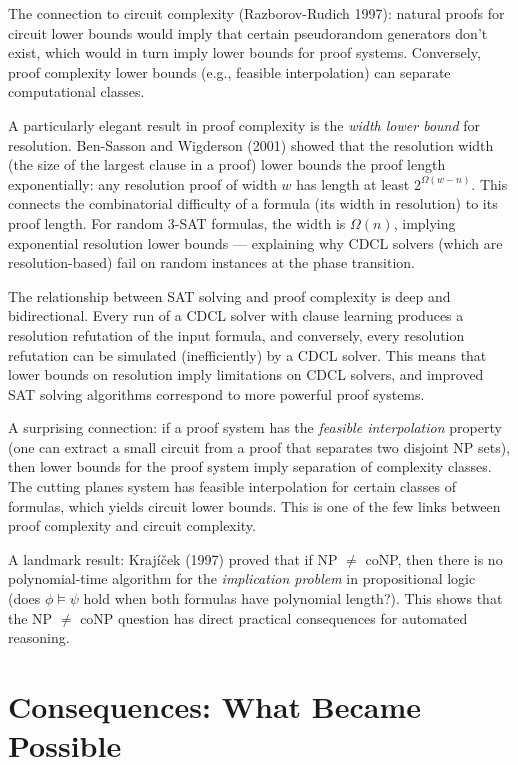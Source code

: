 The connection to circuit complexity (Razborov-Rudich 1997): natural proofs for circuit lower bounds would imply that certain pseudorandom generators don't exist, which would in turn imply lower bounds for proof systems. Conversely, proof complexity lower bounds (e.g., feasible interpolation) can separate computational classes.

A particularly elegant result in proof complexity is the \emph{width lower bound} for resolution. Ben-Sasson and Wigderson (2001) showed that the resolution width (the size of the largest clause in a proof) lower bounds the proof length exponentially: any resolution proof of width $w$ has length at least $2^{\Omega(w - n)}$. This connects the combinatorial difficulty of a formula (its width in resolution) to its proof length. For random 3-SAT formulas, the width is $\Omega(n)$, implying exponential resolution lower bounds — explaining why CDCL solvers (which are resolution-based) fail on random instances at the phase transition.

The relationship between SAT solving and proof complexity is deep and bidirectional. Every run of a CDCL solver with clause learning produces a resolution refutation of the input formula, and conversely, every resolution refutation can be simulated (inefficiently) by a CDCL solver. This means that lower bounds on resolution imply limitations on CDCL solvers, and improved SAT solving algorithms correspond to more powerful proof systems.

A surprising connection: if a proof system has the \emph{feasible interpolation} property (one can extract a small circuit from a proof that separates two disjoint NP sets), then lower bounds for the proof system imply separation of complexity classes. The cutting planes system has feasible interpolation for certain classes of formulas, which yields circuit lower bounds. This is one of the few links between proof complexity and circuit complexity.

A landmark result: Krajíček (1997) proved that if NP $\neq$ coNP, then there is no polynomial-time algorithm for the \emph{implication problem} in propositional logic (does $\phi \models \psi$ hold when both formulas have polynomial length?). This shows that the NP $\neq$ coNP question has direct practical consequences for automated reasoning.

\section{Consequences: What Became Possible}
\label{sec:np:consequences}

